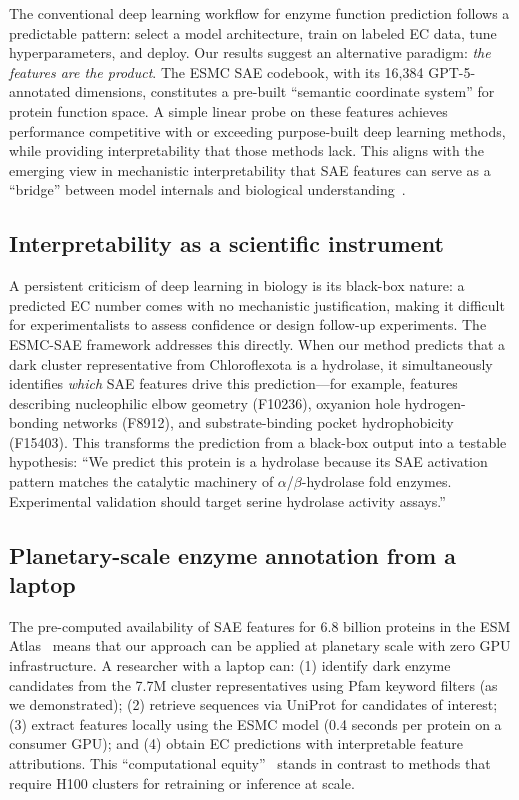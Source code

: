 \documentclass[12pt,a4paper]{article}
\begin{document}
The conventional deep learning workflow for enzyme function prediction follows a predictable pattern: select a model architecture, train on labeled EC data, tune hyperparameters, and deploy. Our results suggest an alternative paradigm: \textit{the features are the product}. The ESMC SAE codebook, with its 16,384 GPT-5-annotated dimensions, constitutes a pre-built ``semantic coordinate system'' for protein function space. A simple linear probe on these features achieves performance competitive with or exceeding purpose-built deep learning methods, while providing interpretability that those methods lack. This aligns with the emerging view in mechanistic interpretability that SAE features can serve as a ``bridge'' between model internals and biological understanding~\cite{adams2025mechanistic, simon2025interplm}.

\subsection{Interpretability as a scientific instrument}

A persistent criticism of deep learning in biology is its black-box nature: a predicted EC number comes with no mechanistic justification, making it difficult for experimentalists to assess confidence or design follow-up experiments. The ESMC-SAE framework addresses this directly. When our method predicts that a dark cluster representative from Chloroflexota is a hydrolase, it simultaneously identifies \textit{which} SAE features drive this prediction---for example, features describing nucleophilic elbow geometry (F10236), oxyanion hole hydrogen-bonding networks (F8912), and substrate-binding pocket hydrophobicity (F15403). This transforms the prediction from a black-box output into a testable hypothesis: ``We predict this protein is a hydrolase because its SAE activation pattern matches the catalytic machinery of $\alpha$/$\beta$-hydrolase fold enzymes. Experimental validation should target serine hydrolase activity assays.''

\subsection{Planetary-scale enzyme annotation from a laptop}

The pre-computed availability of SAE features for 6.8 billion proteins in the ESM Atlas~\cite{candido2026language} means that our approach can be applied at planetary scale with zero GPU infrastructure. A researcher with a laptop can: (1) identify dark enzyme candidates from the 7.7M cluster representatives using Pfam keyword filters (as we demonstrated); (2) retrieve sequences via UniProt for candidates of interest; (3) extract features locally using the ESMC model (0.4 seconds per protein on a consumer GPU); and (4) obtain EC predictions with interpretable feature attributions. This ``computational equity''~\cite{bileschi2022using} stands in contrast to methods that require H100 clusters for retraining or inference at scale.
\end{document}
